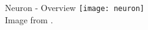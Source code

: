 \begin{frame}[c]{Neuron - Overview}
    \texttt{[image: neuron]} \\
    Image from \cite{figneuron}.
\end{frame}



